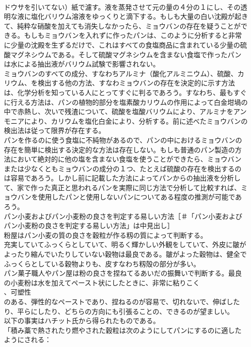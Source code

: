 \documentclass[8pt]{extreport}
\begin{document}
\begin{CJK}{UTF8}{min}
\\	ドウサを引いてない）紙で濾す。液を蒸発させて元の量の４分の１にし、その透明な液に塩化バリウム溶液をゆっくりと滴下する。もしも大量の白い沈殿が起きて、純粋な硝酸を加えても消失しなかったら、ミョウバンの存在を疑うことができる。もしもミョウバンを入れずに作ったパンは、このように分析すると非常に少量の沈殿を生ずるだけで、これはすべての食塩商品に含まれている少量の硫酸マグネシウムである。そして硫酸マグネシウムを含まない食塩で作ったパンは水による抽出液がバリウム試験で影響されない。
\\	ミョウバンのすべての成分、すなわちアルミナ（酸化アルミニウム）、硫酸、カリウム、を検出する他の方法、すなわミョウバンの存在を決定的に示す方法は、化学分析を知っている人にとってすぐに判るであろう。すなわち、最もすぐに行える方法は、パンの植物的部分を塩素酸カリウムの作用によって白金坩堝の中で赤熱し、次いで残渣について、硫酸を塩酸バリウムにより、アルミナをアンモニアにより、カリウムを塩化白金により、分析する。前に述べたミョウバンの検出法は従って限界が存在する。
\\	パンを作るのに使う食塩に不純物があるので、パンの中におけるミョウバンの存在を簡単に検出する決定的な方法は存在しない。もしも普通のパン製造の方法において絶対的に他の塩を含まない食塩を使うことができたら、ミョウバンまたは少なくともミョウバンの成分の１つ、たとえば硫酸の存在を検出するのは容易であろう。しかし前に記載した方法によってパンからの抽出液を分析して、家で作った真正と思われるパンを実際に同じ方法で分析して比較すれば、ミョウバンを使用したパンと使用しないパンについてある程度の推測が可能であろう。
\\	パン小麦およびパン小麦粉の良さを判定する易しい方法［＃「パン小麦およびパン小麦粉の良さを判定する易しい方法」は中見出し］
\\	粉屋はパン小麦の質の良さを穀粒が作る籾の質によって判断する。
\\	充実していてふっくらとしていて、明るく輝かしい外観をしていて、外皮に皺がよったり縮んでいたりしていない穀物は最良である。皺がよった穀物は、健全でふっくらとしている穀物よりも、皮すなわち籾殻の部分が多い。
\\	パン菓子職人やパン屋は粉の良さを捏ねてるあいだの振舞いで判断する。最良の小麦粉は水を加えてペースト状にしたときに、非常に粘りこく
\\	、可塑性
\\	のある、弾性的なペーストであり、捏ねるのが容易で、切れないで、伸ばしたり、平らにしたり、どちらの方向にも引張ることの、できるのが望ましい。
\\	以下の事実はハチット氏から得られたものである。
\\	「積み藁で熱されたり燃やされた穀粒は次のようにしてパンにするのに適したようにされる：

\end{CJK}
\end{document}
